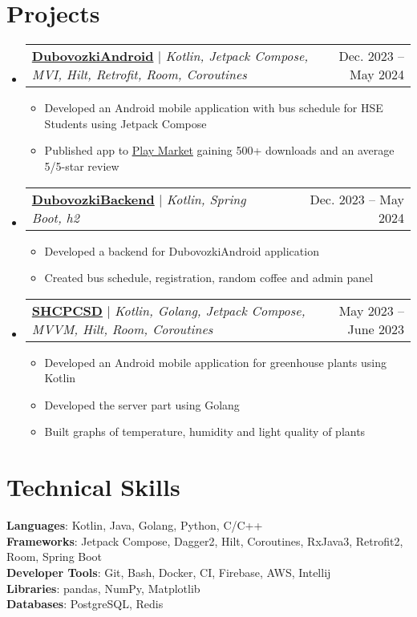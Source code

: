 \documentclass[letterpaper,11pt]{article}
\makeatletter
\newcommand{\resumeItem}[1]{
  \item\small{
    {#1 \vspace{-2pt}}
  }
}
\newcommand{\resumeProjectHeading}[2]{
    \item
    \begin{tabular*}{0.97\textwidth}{l@{\extracolsep{\fill}}r}
      \small#1 & #2 \\
    \end{tabular*}\vspace{-7pt}
}
\newcommand{\resumeSubHeadingListStart}{\begin{itemize}[leftmargin=0.15in, label={}]}
\newcommand{\resumeSubHeadingListEnd}{\end{itemize}}
\newcommand{\resumeItemListStart}{\begin{itemize}}
\newcommand{\resumeItemListEnd}{\end{itemize}\vspace{-5pt}}
\makeatother
\begin{document}
\section{Projects}
    \resumeSubHeadingListStart
      \resumeProjectHeading
          {\textbf{\href{https://github.com/alad1nks/DubovozkiAndroid}{DubovozkiAndroid}} $|$ \emph{Kotlin, Jetpack Compose, MVI, Hilt, Retrofit, Room, Coroutines}}{Dec. 2023 -- May 2024}
          \resumeItemListStart
            \resumeItem{Developed an Android mobile application with bus schedule for HSE Students using Jetpack Compose}
            \resumeItem{Published app to \href{https://play.google.com/store/apps/details?id=com.app.dubkiapp}{\underline{Play Market}} gaining 500+ downloads and an average 5/5-star review}
          \resumeItemListEnd
      \resumeProjectHeading
          {\textbf{\href{https://github.com/alad1nks/DubovozkiBackend}{DubovozkiBackend}} $|$ \emph{Kotlin, Spring Boot, h2}}{Dec. 2023 -- May 2024}
          \resumeItemListStart
            \resumeItem{Developed a backend for DubovozkiAndroid application}
            \resumeItem{Created bus schedule, registration, random coffee and admin panel}
          \resumeItemListEnd
      \resumeProjectHeading
          {\textbf{\href{https://github.com/alad1nks/SHCPCSD}{SHCPCSD}} $|$ \emph{Kotlin, Golang, Jetpack Compose, MVVM, Hilt, Room, Coroutines}}{May 2023 -- June 2023}
          \resumeItemListStart
            \resumeItem{Developed an Android mobile application for greenhouse plants using Kotlin}
            \resumeItem{Developed the server part using Golang}
            \resumeItem{Built graphs of temperature, humidity and light quality of plants}
          \resumeItemListEnd
    \resumeSubHeadingListEnd


\section{Technical Skills}
 \begin{itemize}[leftmargin=0.15in, label={}]
    \small{\item{
     \textbf{Languages}{: Kotlin, Java, Golang, Python, C/C++} \\
     \textbf{Frameworks}{: Jetpack Compose, Dagger2, Hilt, Coroutines, RxJava3, Retrofit2, Room, Spring Boot} \\
     \textbf{Developer Tools}{: Git, Bash, Docker, CI, Firebase, AWS, Intellij} \\
     \textbf{Libraries}{: pandas, NumPy, Matplotlib} \\
     \textbf{Databases}{: PostgreSQL, Redis}
    }}
 \end{itemize}
\end{document}
